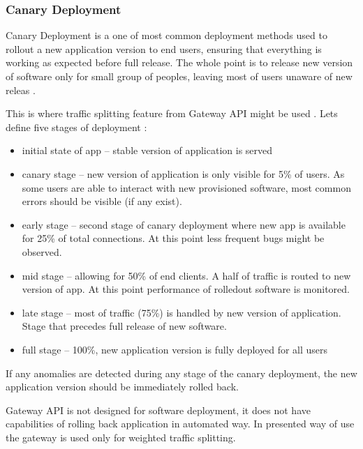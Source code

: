 \subsubsection{Canary Deployment}
\label{subsubsection:canary}

Canary Deployment is a one of most common deployment methods used to rollout a new application version to end users, ensuring that everything is working as expected before full release. The whole point is to release new version of software only for small group of peoples, leaving most of users unaware of new releas \cite{Canary}.

This is where traffic splitting feature from Gateway API might be used \cite{CiliumTrafficSplitting}. Lets define five stages of deployment \cite{Canary}:

\begin{itemize}
    \item initial state of app -- stable version of application is served
    \item canary stage -- new version of application is only visible for 5\% of users. As some users are able to interact with new provisioned software, most common errors should be visible (if any exist).
    \item early stage -- second stage of canary deployment where new app is available for 25\% of total connections. At this point less frequent bugs might be observed.
    \item mid stage -- allowing for 50\% of end clients. A half of traffic is routed to new version of app. At this point performance of rolledout software is monitored.
    \item late stage -- most of traffic (75\%) is handled by new version of application. Stage that precedes full release of new software.
    \item full stage -- 100\%, new application version is fully deployed for all users
\end{itemize}

If any anomalies are detected during any stage of the canary deployment, the new application version should be immediately rolled back.

Gateway API is not designed for software deployment, it does not have capabilities of rolling back application in automated way. In presented way of use the gateway is used only for weighted traffic splitting.


